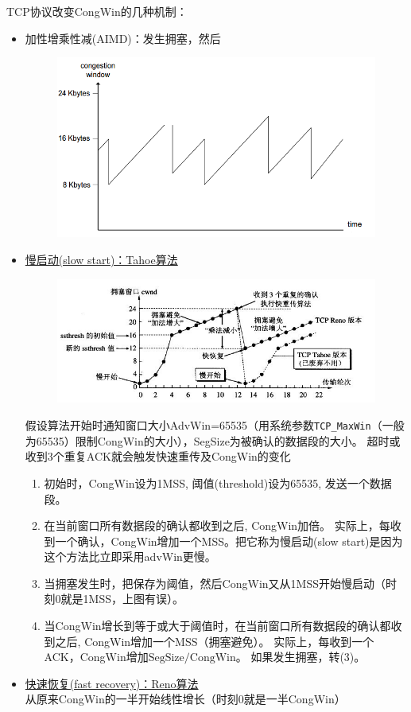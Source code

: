 \myhline
TCP协议改变CongWin的几种机制：
\begin{itemize}
    \item 加性增乘性减(AIMD)：发生拥塞，然后
    \begin{figure}[H]
        \centering
        \includegraphics[width=0.5\linewidth]{fig/congression-AIMD.PNG}
    \end{figure}
    \item \underline{慢启动(slow start)：Tahoe算法}
    \begin{figure}[H]
        \centering
        \includegraphics[width=0.8\linewidth]{fig/congression-slow-start.PNG}
    \end{figure}
    假设算法开始时通知窗口大小AdvWin=65535（用系统参数\verb'TCP_MaxWin'（一般为65535）限制CongWin的大小），SegSize为被确认的数据段的大小。
    超时或收到3个重复ACK就会触发快速重传及CongWin的变化
    \begin{enumerate}
        \item 初始时，CongWin设为1MSS, 阈值(threshold)设为65535, 发送一个数据段。
        \item 在当前窗口所有数据段的确认都收到之后, CongWin加倍。
        实际上，每收到一个确认，CongWin增加一个MSS。把它称为慢启动(slow start)是因为这个方法比立即采用advWin更慢。
        \item 当拥塞发生时，把保存为阈值，然后CongWin又从1MSS开始慢启动（时刻0就是1MSS，上图有误）。
        \item 当CongWin增长到等于或大于阈值时，在当前窗口所有数据段的确认都收到之后, CongWin增加一个MSS（拥塞避免）。
        实际上，每收到一个ACK，CongWin增加$\text{SegSize} / \text{CongWin}$。
        如果发生拥塞，转(3)。
    \end{enumerate}
    \item \underline{快速恢复(fast recovery)：Reno算法}\\
    从原来CongWin的一半开始线性增长（时刻0就是一半CongWin）
\end{itemize}

